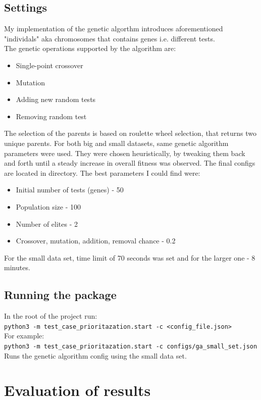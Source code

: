 \documentclass[12pt]{article}
\begin{document}
\subsection{Settings}
My implementation of the genetic algorthm introduces aforementioned "individals" aka chromosomes that contains genes i.e. different tests.\\
The genetic operations supported by the algorithm are:
\begin{itemize}
  \item Single-point crossover
  \item Mutation
  \item Adding new random tests
  \item Removing random test
\end{itemize}
The selection of the parents is based on roulette wheel selection, that returns two unique parents. For both big and small datasets, same genetic algorithm parameters were used. They were chosen heuristically, by tweaking them back and forth until a steady increase in overall fitness was observed. The final configs are located in  directory.
The best parameters I could find were:
\begin{itemize}
  \item Initial number of tests (genes) - 50
  \item Population size - 100
  \item Number of elites - 2
  \item Crossover, mutation, addition, removal chance - 0.2
\end{itemize}
For the small data set, time limit of 70 seconds was set and for the larger one - 8 minutes.
\subsection{Running the package}
In the root of the project run:\\
\texttt{python3 -m test\_case\_prioritazation.start -c <config\_file.json>}\\
For example:\\
\texttt{python3 -m test\_case\_prioritazation.start -c configs/ga\_small\_set.json}\\
Runs the genetic algorithm config using the small data set.

\section{Evaluation of results}
\end{document}
